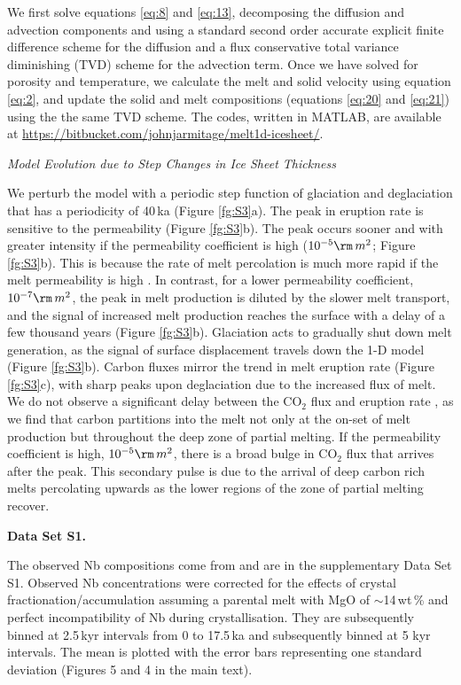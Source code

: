 \documentclass[draft,grl]{agutexSI2018}
\begin{document}
\begin{article}
We first solve equations \ref{eq:8} and \ref{eq:13}, decomposing the diffusion and advection components and using a standard second order accurate explicit finite difference scheme for the diffusion and a flux conservative total variance diminishing (TVD) scheme for the advection term. Once we have solved for porosity and temperature, we calculate the melt and solid velocity using equation \ref{eq:2}, and update the solid and melt compositions (equations \ref{eq:20} and \ref{eq:21}) using the the same TVD scheme. The codes, written in MATLAB, are available at \url{https://bitbucket.com/johnjarmitage/melt1d-icesheet/}.

\noindent\textit{Model Evolution due to Step Changes in Ice Sheet Thickness}

We perturb the model with a periodic step function of glaciation and deglaciation that has a periodicity of 40\,ka (Figure \ref{fg:S3}a). The peak in eruption rate is sensitive to the permeability (Figure \ref{fg:S3}b). The peak occurs sooner and with greater intensity if the permeability coefficient is high ($10^{-5}\rm\,m^{2}$; Figure \ref{fg:S3}b). This is because the rate of melt percolation is much more rapid if the melt permeability is high \citep{burley-2015}. In contrast, for a lower permeability coefficient, $10^{-7}\rm\,m^{2}$, the peak in melt production is diluted by the slower melt transport, and the signal of increased melt production reaches the surface with a delay of a few thousand years (Figure \ref{fg:S3}b). Glaciation acts to gradually shut down melt generation, as the signal of surface displacement travels down the 1-D model (Figure \ref{fg:S3}b). Carbon fluxes mirror the trend in melt eruption rate (Figure \ref{fg:S3}c), with sharp peaks upon deglaciation due to the increased flux of melt. We do not observe a significant delay between the CO$_{2}$ flux and eruption rate \citep{burley-2015}, as we find that carbon partitions into the melt not only at the on-set of melt production but throughout the deep zone of partial melting. If the permeability coefficient is high, $10^{-5}\rm\,m^{2}$, there is a broad bulge in CO$_{2}$ flux that arrives after the peak. This secondary pulse is due to the arrival of deep carbon rich melts percolating upwards as the lower regions of the zone of partial melting recover.

\noindent\textbf{Data Set S1.}

The observed Nb compositions come from \citet{gee-etal-1998,sinton-etal-2005,eason-etal-2015} and are in the supplementary Data Set S1. Observed Nb concentrations were corrected for the effects of crystal fractionation/accumulation assuming a parental melt with MgO of $\sim$14\,wt\,\% and perfect incompatibility of Nb during crystallisation. They are subsequently binned at 2.5\,kyr intervals from 0 to 17.5\,ka and subsequently binned at 5 kyr intervals. The mean is plotted with the error bars representing one standard deviation (Figures 5 and 4 in the main text).

\newcommand{\newblock}{}


\end{article}
\clearpage
\end{document}
